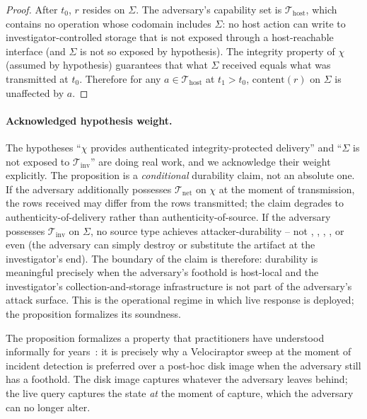 \begin{proof}
After $t_0$, $r$ resides on $\Sigma$. The adversary's capability set is
$\mathcal{T}_{\mathrm{host}}$, which contains no operation whose codomain
includes $\Sigma$: no host action can write to investigator-controlled
storage that is not exposed through a host-reachable interface (and
$\Sigma$ is not so exposed by hypothesis). The integrity property of
$\chi$ (assumed by hypothesis) guarantees that what $\Sigma$ received
equals what was transmitted at $t_0$. Therefore for any $a \in
\mathcal{T}_{\mathrm{host}}$ at $t_1 > t_0$, $\mathrm{content}(r)$ on
$\Sigma$ is unaffected by $a$. \qedhere
\end{proof}

\paragraph{Acknowledged hypothesis weight.}
The hypotheses ``$\chi$ provides authenticated integrity-protected
delivery'' and ``$\Sigma$ is not exposed to $\mathcal{T}_{\mathrm{inv}}$''
are doing real work, and we acknowledge their weight explicitly. The
proposition is a \emph{conditional} durability claim, not an absolute one.
If the adversary additionally possesses $\mathcal{T}_{\mathrm{net}}$ on
$\chi$ at the moment of transmission, the rows received may differ from
the rows transmitted; the claim degrades to authenticity-of-delivery
rather than authenticity-of-source. If the adversary possesses
$\mathcal{T}_{\mathrm{inv}}$ on $\Sigma$, no source type achieves
attacker-durability -- not , , , , or even
 (the adversary can simply destroy or substitute the artifact at
the investigator's end). The boundary of the claim is therefore: 
durability is meaningful precisely when the adversary's foothold is
host-local and the investigator's collection-and-storage infrastructure
is not part of the adversary's attack surface. This is the operational
regime in which live response is deployed; the proposition formalizes its
soundness.

The proposition formalizes a property that practitioners have understood
informally for years~\cite{cohen2011distributed}: it is precisely why a
Velociraptor sweep at the moment of incident detection is preferred over a
post-hoc disk image when the adversary still has a foothold. The disk image
captures whatever the adversary leaves behind; the live query captures the
state \emph{at} the moment of capture, which the adversary can no longer
alter.

